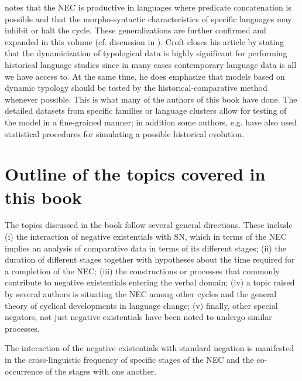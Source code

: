 \documentclass[output=paper,chinesefont,colorlinks,citecolor=brown]{langscibook}
\begin{document}
\citet[23--24]{Croft1991} notes that the NEC is productive in languages where predicate concatenation is possible and that the morpho-syntactic characteristics of specific languages may inhibit or halt the cycle. These generalizations are further confirmed and expanded in this volume (cf. discussion in ). Croft closes his article by stating that the dynamicization of typological data is highly significant for performing historical language studies since in many cases contemporary language data is all we have access to. At the same time, he does emphasize that models based on dynamic typology should be tested by the historical-comparative method whenever possible. This is what many of the authors of this book have done. The detailed datasets from specific families or language clusters allow for testing of the model in a fine-grained manner; in addition some authors, e.g.  have also used statistical procedures for simulating a possible historical evolution.

\section{Outline of the topics covered in this book} \label{section:outline_of_topics}\label{sec:intro:3}
The topics discussed in the book follow several general directions. These include
(i) the interaction of negative existentials with SN, which in terms of the NEC implies an analysis of comparative data in terms of its different stages;
(ii)  the duration of different stages together with hypotheses about the time required for a completion of the NEC;
(iii) the constructions or processes that commonly contribute to negative existentials entering the verbal domain;
(iv) a topic raised by several authors is situating the NEC among other cycles and the general theory of cyclical developments in language change;
(v) finally, other special negators, not just negative existentials have been noted to undergo similar processes.

The interaction of the negative existentials with standard negation is manifested in the cross-linguistic frequency of specific stages of the NEC and the co-occurrence of the stages with one another.
\end{document}

